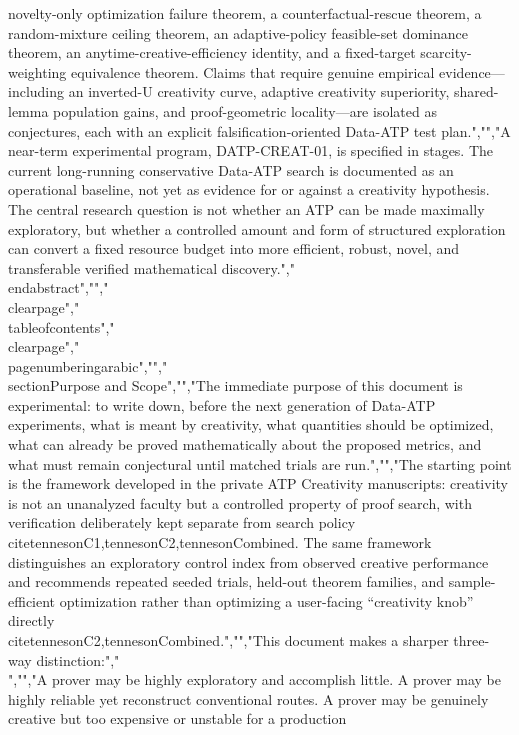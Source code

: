 {{{novelty-only optimization failure theorem, a counterfactual-rescue theorem, a random-mixture ceiling theorem, an adaptive-policy feasible-set dominance theorem, an anytime-creative-efficiency identity, and a fixed-target scarcity-weighting equivalence theorem. Claims that require genuine empirical evidence---including an inverted-U creativity curve, adaptive creativity superiority, shared-lemma population gains, and proof-geometric locality---are isolated as conjectures, each with an explicit falsification-oriented Data-ATP test plan.","","A near-term experimental program, DATP-CREAT-01, is specified in stages. The current long-running conservative Data-ATP search is documented as an operational baseline, not yet as evidence for or against a creativity hypothesis. The central research question is not whether an ATP can be made maximally exploratory, but whether a controlled amount and form of structured exploration can convert a fixed resource budget into more efficient, robust, novel, and transferable verified mathematical discovery.","\\end{abstract}","","\\clearpage","\\tableofcontents","\\clearpage","\\pagenumbering{arabic}","","\\section{Purpose and Scope}","","The immediate purpose of this document is experimental: to write down, before the next generation of Data-ATP experiments, what is meant by creativity, what quantities should be optimized, what can already be proved mathematically about the proposed metrics, and what must remain conjectural until matched trials are run.","","The starting point is the framework developed in the private ATP Creativity manuscripts: creativity is not an unanalyzed faculty but a controlled property of proof search, with verification deliberately kept separate from search policy \\cite{tennesonC1,tennesonC2,tennesonCombined}. The same framework distinguishes an exploratory control index from observed creative performance and recommends repeated seeded trials, held-out theorem families, and sample-efficient optimization rather than optimizing a user-facing ``creativity knob'' directly \\cite{tennesonC2,tennesonCombined}.","","This document makes a sharper three-way distinction:","\\[","\\boxed{","\\text{exploratory control}","\\;\\neq\\;","\\text{realized creativity}","\\;\\neq\\;","\\text{overall proof-search quality}.}","\\]","","A prover may be highly exploratory and accomplish little. A prover may be highly reliable yet reconstruct conventional routes. A prover may be genuinely creative but too expensive or unstable for a production }}}
